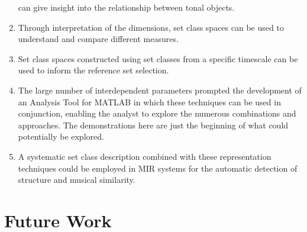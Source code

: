 \documentclass{article}
\begin{document}
\begin{enumerate}
    can give insight into the relationship between tonal objects.
\item Through interpretation of the dimensions, set class spaces can be
    used to understand and compare different measures.
\item Set class spaces constructed using set classes from a specific
    timescale can be used to inform the reference set selection.
\item The large number of interdependent parameters prompted the
    development of an Analysis Tool for MATLAB in which these
    techniques can be used in conjunction, enabling the analyst to
    explore the numerous combinations and approaches. The
    demonstrations here are just the beginning of what could
    potentially be explored.
\item A systematic set class description combined with these
    representation techniques could be employed in MIR systems for the
    automatic detection of structure and musical similarity.
\end{enumerate}

\section{Future Work}
\label{sec-10}
\end{document}

